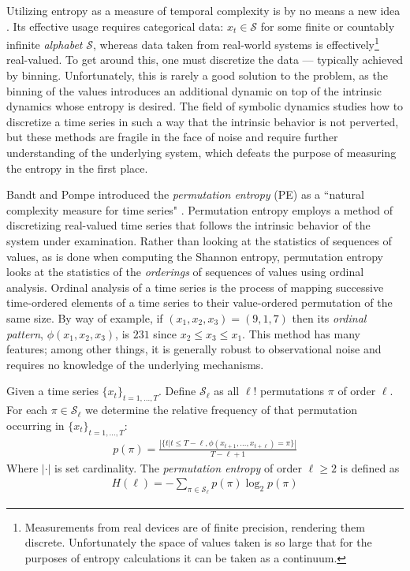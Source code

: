 Utilizing entropy as a measure of temporal complexity is by no means a new idea \cite{Shannon1951, mantegna1994linguistic}. Its effective usage requires categorical data: $x_t \in \mathcal{S}$ for some finite or countably infinite \emph{alphabet} $\mathcal{S}$, whereas data taken from real-world systems is effectively\footnote{Measurements from real devices are of finite precision, rendering them discrete. Unfortunately the space of values taken is so large that for the purposes of entropy calculations it can be taken as a continuum.} real-valued.  To get around this, one must discretize the data --- typically achieved by binning.  Unfortunately, this is rarely a good solution to the problem, as the binning of the values introduces an additional dynamic on top of the intrinsic dynamics whose entropy is desired\cite{bollt2001}. The field of symbolic dynamics studies how to discretize a time series in such a way that the intrinsic behavior is not perverted, but these methods are fragile in the face of noise and require further understanding of the underlying system, which defeats the purpose of measuring the entropy in the first place.

Bandt and Pompe introduced the \emph{permutation entropy} (PE) as a ``natural complexity measure for time series" \cite{bandt2002per}.  Permutation entropy employs a method of discretizing real-valued time series that follows the intrinsic behavior of the system under examination.  Rather than looking at the statistics of sequences of values, as is done when computing the Shannon entropy, permutation entropy looks at the statistics of the \emph{orderings} of sequences of values using ordinal analysis. Ordinal analysis of a time series is the process of mapping successive time-ordered elements of a time series to their value-ordered permutation of the same size.  By way of example, if $(x_1, x_2, x_3) = (9, 1, 7)$ then its \emph{ordinal pattern}, $\phi(x_1, x_2, x_3)$, is $231$ since $x_2 \leq x_3 \leq x_1$.  This method has many features; among other things, it is generally robust to observational noise and requires no knowledge of the underlying mechanisms.

\begin{mydef}

  Given a time series $\{x_t\}_{t = 1,\dots,T}$. Define $\mathcal{S}_\ell$ as all $\ell!$ permutations $\pi$ of order $\ell$. For each $\pi \in \mathcal{S}_\ell$ we determine the relative frequency of that permutation occurring in $\{x_t\}_{t = 1,\dots,T}$:
  \begin{align*}
    p(\pi) = \frac{\left|\{t|t \leq T-\ell,\phi(x_{t+1},\dots,x_{t+\ell}) = \pi\}\right|}{T-\ell+1}
  \end{align*}
  Where $|\cdot|$ is set cardinality. The \emph{permutation entropy} of order $\ell \ge 2$ is defined as
  \begin{align*}
    H(\ell) = - \sum_{\pi \in \mathcal{S}_\ell} p(\pi) \log_2 p(\pi)
  \end{align*}

\end{mydef}

